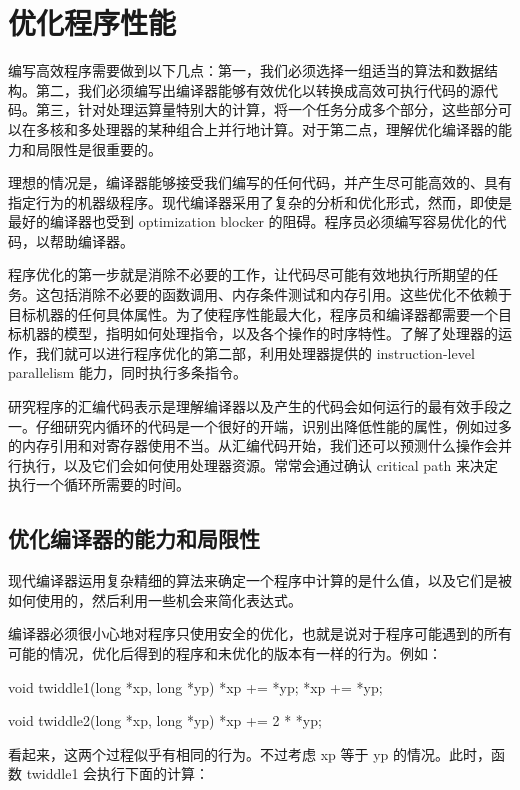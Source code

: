 \chapter{优化程序性能}

编写高效程序需要做到以下几点：第一，我们必须选择一组适当的算法和数据结构。第二，我们必须编写出编译器能够有效优化以转换成高效可执行代码的源代码。第三，针对处理运算量特别大的计算，将一个任务分成多个部分，这些部分可以在多核和多处理器的某种组合上并行地计算。对于第二点，理解优化编译器的能力和局限性是很重要的。

理想的情况是，编译器能够接受我们编写的任何代码，并产生尽可能高效的、具有指定行为的机器级程序。现代编译器采用了复杂的分析和优化形式，然而，即使是最好的编译器也受到 optimization blocker 的阻碍。程序员必须编写容易优化的代码，以帮助编译器。

程序优化的第一步就是消除不必要的工作，让代码尽可能有效地执行所期望的任务。这包括消除不必要的函数调用、内存条件测试和内存引用。这些优化不依赖于目标机器的任何具体属性。为了使程序性能最大化，程序员和编译器都需要一个目标机器的模型，指明如何处理指令，以及各个操作的时序特性。了解了处理器的运作，我们就可以进行程序优化的第二部，利用处理器提供的 instruction-level parallelism 能力，同时执行多条指令。

研究程序的汇编代码表示是理解编译器以及产生的代码会如何运行的最有效手段之一。仔细研究内循环的代码是一个很好的开端，识别出降低性能的属性，例如过多的内存引用和对寄存器使用不当。从汇编代码开始，我们还可以预测什么操作会并行执行，以及它们会如何使用处理器资源。常常会通过确认 critical path 来决定执行一个循环所需要的时间。

\section{优化编译器的能力和局限性}

现代编译器运用复杂精细的算法来确定一个程序中计算的是什么值，以及它们是被如何使用的，然后利用一些机会来简化表达式。

编译器必须很小心地对程序只使用安全的优化，也就是说对于程序可能遇到的所有可能的情况，优化后得到的程序和未优化的版本有一样的行为。例如：

\begin{cppcode}
void twiddle1(long *xp, long *yp) {
  *xp += *yp;
  *xp += *yp;
}

void twiddle2(long *xp, long *yp) {
  *xp += 2 * *yp;
}
\end{cppcode}

看起来，这两个过程似乎有相同的行为。不过考虑 xp 等于 yp 的情况。此时，函数 twiddle1 会执行下面的计算：

